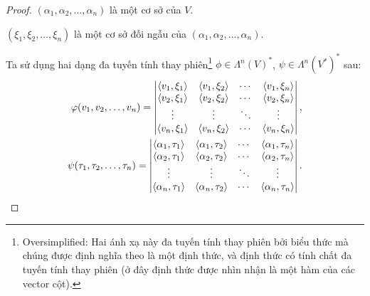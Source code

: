 \begin{proof}
    $(\alpha_{1}, \alpha_{2}, \ldots, \alpha_{n})$ là một cơ sở của $V$.
    
    $(\xi_{1}, \xi_{2}, \ldots, \xi_{n})$ là một cơ sở đối ngẫu của $(\alpha_{1}, \alpha_{2}, \ldots, \alpha_{n})$.
    
    Ta sử dụng hai dạng đa tuyến tính thay phiên\footnote{Oversimplified: Hai ánh xạ này đa tuyến tính thay phiên bởi biểu thức mà chúng được định nghĩa theo là một định thức, và định thức có tính chất đa tuyến tính thay phiên (ở đây định thức được nhìn nhận là một hàm của các vector cột).} $\phi \in {\Lambda^{n}(V)}^{*}$, $\psi \in {\Lambda^{n}({V}^{*})}^{*}$ sau:
    \[
        \begin{split}
            \varphi(v_{1}, v_{2}, \ldots, v_{n}) = \begin{vmatrix}
                                                    \left\langle{v_{1}, \xi_{1}}\right\rangle & \left\langle{v_{1}, \xi_{2}}\right\rangle & \cdots & \left\langle{v_{1}, \xi_{n}}\right\rangle \\
                                                    \left\langle{v_{2}, \xi_{1}}\right\rangle & \left\langle{v_{2}, \xi_{2}}\right\rangle & \cdots & \left\langle{v_{2}, \xi_{n}}\right\rangle \\
                                                    \vdots                   & \vdots                   & \ddots & \vdots                   \\
                                                    \left\langle{v_{n}, \xi_{1}}\right\rangle & \left\langle{v_{n}, \xi_{2}}\right\rangle & \cdots & \left\langle{v_{n}, \xi_{n}}\right\rangle
                                                \end{vmatrix}, \\
            \psi(\tau_{1}, \tau_{2}, \ldots, \tau_{n}) = \begin{vmatrix}
                                                             \left\langle{\alpha_{1}, \tau_{1}}\right\rangle & \left\langle{\alpha_{1}, \tau_{2}}\right\rangle & \cdots & \left\langle{\alpha_{1}, \tau_{n}}\right\rangle \\
                                                             \left\langle{\alpha_{2}, \tau_{1}}\right\rangle & \left\langle{\alpha_{2}, \tau_{2}}\right\rangle & \cdots & \left\langle{\alpha_{2}, \tau_{n}}\right\rangle \\
                                                             \vdots                         & \vdots                         & \ddots & \vdots                         \\
                                                             \left\langle{\alpha_{n}, \tau_{1}}\right\rangle & \left\langle{\alpha_{n}, \tau_{2}}\right\rangle & \cdots & \left\langle{\alpha_{n}, \tau_{n}}\right\rangle
                                                         \end{vmatrix}.
        \end{split}
    \]
    

\end{proof}
